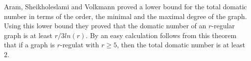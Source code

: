 \begin{remark}
  Aram, Sheikholeslami and Volkmann \cite{regular} proved a lower bound for the total
  domatic number in terms of the order, the minimal and the maximal degree of the
  graph. Using this lower bound they proved that the domatic number of an $r$-regular graph
  is at least $r/3ln(r)$. By an easy calculation follows from this theorem that
  if a graph is $r$-regulat with $r \ge 5$, then the total domatic number is at least
  $2$.
\end{remark}
